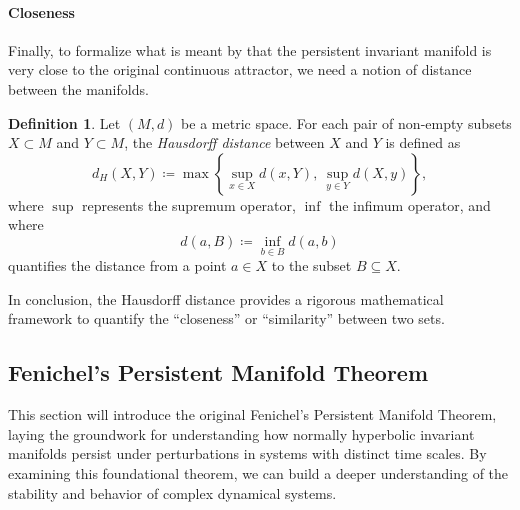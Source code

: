 \documentclass{article} %
\newcounter{ct}
\theoremstyle{definition}
\newtheorem{definition}{Definition}
\theoremstyle{remark}
\begin{document}
\paragraph{Closeness}
Finally, to formalize what is meant by that the persistent invariant manifold is very close to the original continuous attractor, we need a notion of distance between the manifolds.
\begin{definition}
Let \((M, d)\) be a metric space. For each pair of non-empty subsets \(X \subset M\) and \(Y \subset M\), the \emph{Hausdorff distance} between \(X\) and \(Y\) is defined as
\[
d_{H}(X, Y) \coloneqq \max \left\{ \sup_{x \in X} d(x, Y), \ \sup_{y \in Y} d(X, y) \right\},
\]
where \(\sup\) represents the supremum operator, \(\inf\) the infimum operator, and where
\[
d(a, B) \coloneqq \inf_{b \in B} d(a, b)
\]
quantifies the distance from a point \(a \in X\) to the subset \(B \subseteq X\).
\end{definition}

In conclusion, the Hausdorff distance provides a rigorous mathematical framework to quantify the ``closeness'' or ``similarity'' between two sets.




\subsection{Fenichel's Persistent Manifold Theorem}

This section will introduce the original Fenichel's Persistent Manifold Theorem, laying the groundwork for understanding how normally hyperbolic invariant manifolds persist under perturbations in systems with distinct time scales.
 By examining this foundational theorem, we can build a deeper understanding of the stability and behavior of complex dynamical systems.
\end{document}

